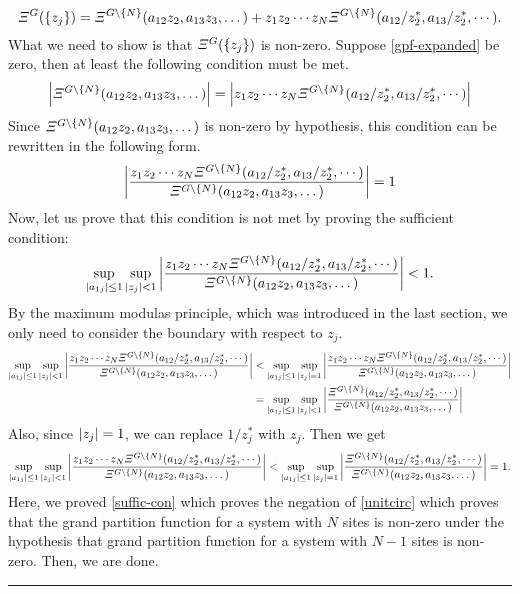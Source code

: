 \documentclass[aps, 12pt]{revtex4-2}
\begin{document}
\begin{dmath}
  \varXi^{G}(\qty{z_j}) = \varXi^{G\backslash \qty{N}}(a_{12}z_2, a_{13}z_3, \dots) + z_1z_2 \cdots z_N\varXi^{G\backslash \qty{N}}(a_{12}/z_{2}^*, a_{13}/z_2^*, \cdots). \label{gpf-expanded}
\end{dmath}
What we need to show is that $\varXi^{G}(\qty{z_j})$ is non-zero. Suppose \eqref{gpf-expanded} be zero, then at least the following condition must be met.
\begin{dmath}
  \qty|\varXi^{G\backslash \qty{N}}(a_{12}z_2, a_{13}z_3, \dots)| = \qty|z_1z_2 \cdots z_N\varXi^{G\backslash \qty{N}}(a_{12}/z_{2}^*, a_{13}/z_2^*, \cdots)|
\end{dmath}
Since $\varXi^{G\backslash \qty{N}}(a_{12}z_2, a_{13}z_3, \dots)$ is non-zero by hypothesis, this condition can be rewritten in the following form.
\begin{dmath}
  \qty|\frac{z_1z_2 \cdots z_N\varXi^{G\backslash \qty{N}}(a_{12}/z_{2}^*, a_{13}/z_2^*, \cdots)}{\varXi^{G\backslash \qty{N}}(a_{12}z_2, a_{13}z_3, \dots)}| = 1 \label{unitcirc}
\end{dmath}
Now, let us prove that this condition is not met by proving the sufficient condition:
\begin{dmath}
  \sup_{\qty|a_{1j}| \leq 1} \sup_{\qty|z_j| < 1} \qty|\frac{z_1z_2 \cdots z_N\varXi^{G\backslash \qty{N}}(a_{12}/z_{2}^*, a_{13}/z_2^*, \cdots)}{\varXi^{G\backslash \qty{N}}(a_{12}z_2, a_{13}z_3, \dots)}| < 1. \label{suffic-con}
\end{dmath}
By the maximum modulas principle, which was introduced in the last section, we only need to consider the boundary with respect to $z_j$.
\begin{align}
  \sup_{\qty|a_{1j}| \leq 1} \sup_{\qty|z_j| < 1} \qty|\frac{z_1z_2 \cdots z_N\varXi^{G\backslash \qty{N}}(a_{12}/z_{2}^*, a_{13}/z_2^*, \cdots)}{\varXi^{G\backslash \qty{N}}(a_{12}z_2, a_{13}z_3, \dots)}| &< \sup_{\qty|a_{1j}| \leq 1} \sup_{\qty|z_j| = 1} \qty|\frac{z_1z_2 \cdots z_N\varXi^{G\backslash \qty{N}}(a_{12}/z_{2}^*, a_{13}/z_2^*, \cdots)}{\varXi^{G\backslash \qty{N}}(a_{12}z_2, a_{13}z_3, \dots)}| \nonumber \\
  &= \sup_{\qty|a_{1j}| \leq 1} \sup_{\qty|z_j| < 1} \qty|\frac{\varXi^{G\backslash \qty{N}}(a_{12}/z_{2}^*, a_{13}/z_2^*, \cdots)}{\varXi^{G\backslash \qty{N}}(a_{12}z_2, a_{13}z_3, \dots)}|
\end{align}
Also, since $\qty|z_j| = 1$, we can replace $1/z_j^*$ with $z_j$. Then we get
\begin{align}
  \sup_{\qty|a_{1j}| \leq 1} \sup_{\qty|z_j| < 1} \qty|\frac{z_1z_2 \cdots z_N\varXi^{G\backslash \qty{N}}(a_{12}/z_{2}^*, a_{13}/z_2^*, \cdots)}{\varXi^{G\backslash \qty{N}}(a_{12}z_2, a_{13}z_3, \dots)}| < \sup_{\qty|a_{1j}| \leq 1} \sup_{\qty|z_j| = 1} \qty|\frac{\varXi^{G\backslash \qty{N}}(a_{12}/z_{2}^*, a_{13}/z_2^*, \cdots)}{\varXi^{G\backslash \qty{N}}(a_{12}z_2, a_{13}z_3, \dots)}| = 1.
\end{align}
Here, we proved \eqref{suffic-con} which proves the negation of \eqref{unitcirc} which proves that the grand partition function for a system with $N$ sites is non-zero under the hypothesis that grand partition function for a system with $N-1$ sites is non-zero. Then, we are done. \hfill \rule{1.5mm}{3.5mm}
\end{document}
